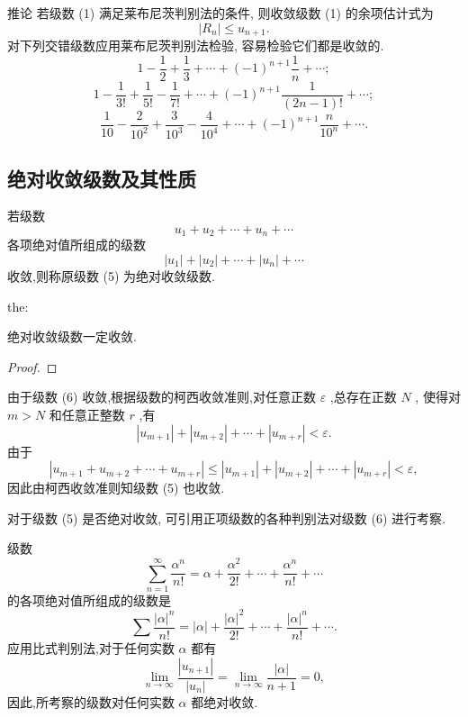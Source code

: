 推论 若级数 (1) 满足莱布尼茨判别法的条件, 则收敛级数 (1) 的余项估计式为
\[
\left| {R}_{n}\right|  \leq  {u}_{n + 1}.
\]
对下列交错级数应用莱布尼茨判别法检验, 容易检验它们都是收敛的.
\[
1 - \frac{1}{2} + \frac{1}{3} + \cdots  + {\left( -1\right) }^{n + 1}\frac{1}{n} + \cdots ; \tag{2}
\]
\[
1 - \frac{1}{3!} + \frac{1}{5!} - \frac{1}{7!} + \cdots  + {\left( -1\right) }^{n + 1}\frac{1}{\left( {{2n} - 1}\right) !} + \cdots ; \tag{3}
\]
\[
\frac{1}{10} - \frac{2}{{10}^{2}} + \frac{3}{{10}^{3}} - \frac{4}{{10}^{4}} + \cdots  + {\left( -1\right) }^{n + 1}\frac{n}{{10}^{n}} + \cdots . \tag{4}
\]
\subsection{绝对收敛级数及其性质}

若级数
\[
{u}_{1} + {u}_{2} + \cdots  + {u}_{n} + \cdots  \tag{5}
\]
各项绝对值所组成的级数
\[
\left| {u}_{1}\right|  + \left| {u}_{2}\right|  + \cdots  + \left| {u}_{n}\right|  + \cdots  \tag{6}
\]
收敛,则称原级数 (5) 为绝对收敛级数.

\begin{theorem}{}{the:}

\end{theorem}
 绝对收敛级数一定收敛.

\begin{proof}

\end{proof}
由于级数 (6) 收敛,根据级数的柯西收敛准则,对任意正数 \(\varepsilon\) ,总存在正数 \(N\) , 使得对 \(m > N\) 和任意正整数 \(r\) ,有
\[
\left| {u}_{m + 1}\right|  + \left| {u}_{m + 2}\right|  + \cdots  + \left| {u}_{m + r}\right|  < \varepsilon .
\]
由于
\[
\left| {{u}_{m + 1} + {u}_{m + 2} + \cdots  + {u}_{m + r}}\right|  \leq  \left| {u}_{m + 1}\right|  + \left| {u}_{m + 2}\right|  + \cdots  + \left| {u}_{m + r}\right|  < \varepsilon ,
\]
因此由柯西收敛准则知级数 (5) 也收敛.

对于级数 (5) 是否绝对收敛, 可引用正项级数的各种判别法对级数 (6) 进行考察.

\begin{example}

\end{example}
级数
\[
\mathop{\sum }\limits_{{n = 1}}^{\infty }\frac{{\alpha }^{n}}{n!} = \alpha  + \frac{{\alpha }^{2}}{2!} + \cdots  + \frac{{\alpha }^{n}}{n!} + \cdots
\]
的各项绝对值所组成的级数是
\[
\sum \frac{{\left| \alpha \right| }^{n}}{n!} = \left| \alpha \right|  + \frac{{\left| \alpha \right| }^{2}}{2!} + \cdots  + \frac{{\left| \alpha \right| }^{n}}{n!} + \cdots .
\]
应用比式判别法,对于任何实数 \(\alpha\) 都有
\[
\mathop{\lim }\limits_{{n \rightarrow  \infty }}\frac{\left| {u}_{n + 1}\right| }{\left| {u}_{n}\right| } = \mathop{\lim }\limits_{{n \rightarrow  \infty }}\frac{\left| \alpha \right| }{n + 1} = 0,
\]
因此,所考察的级数对任何实数 \(\alpha\) 都绝对收敛.

